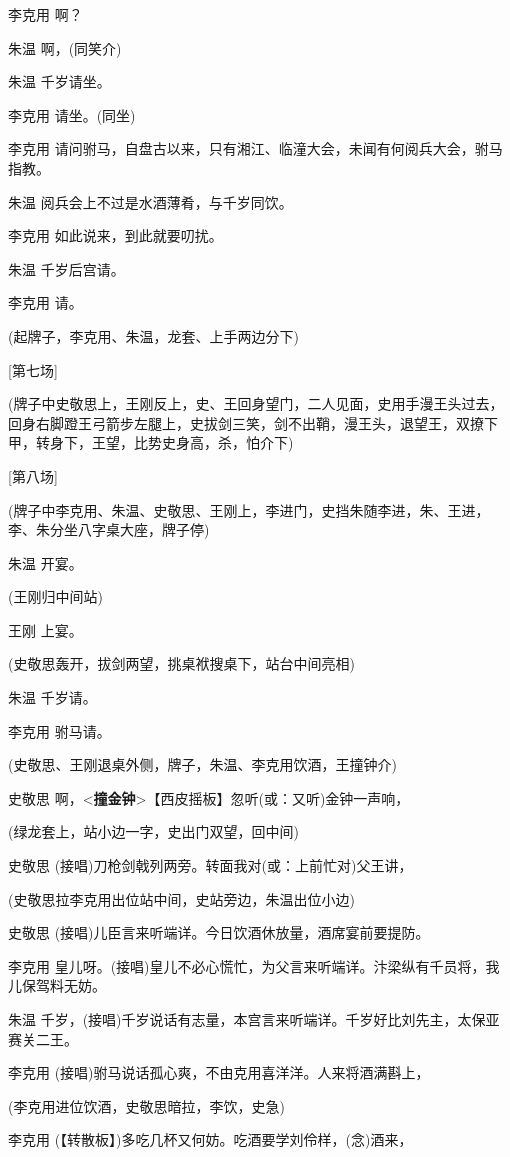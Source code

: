 李克用 啊？

朱温 啊，(同笑介)

朱温 千岁请坐。

李克用 请坐。(同坐)

李克用
请问驸马，自盘古以来，只有湘江、临潼大会，未闻有何阅兵大会，驸马指教。

朱温 阅兵会上不过是水酒薄肴，与千岁同饮。

李克用 如此说来，到此就要叨扰。

朱温 千岁后宫请。

李克用 请。

(起牌子，李克用、朱温，龙套、上手两边分下)

{[}第七场{]}

(牌子中史敬思上，王刚反上，史、王回身望门，二人见面，史用手漫王头过去，回身右脚蹬王弓箭步左腿上，史拔剑三笑，剑不出鞘，漫王头，退望王，双撩下甲，转身下，王望，比势史身高，杀，怕介下)

{[}第八场{]}

(牌子中李克用、朱温、史敬思、王刚上，李进门，史挡朱随李进，朱、王进，李、朱分坐八字桌大座，牌子停)

朱温 开宴。

(王刚归中间站)

王刚 上宴。

(史敬思轰开，拔剑两望，挑桌袱搜桌下，站台中间亮相)

朱温 千岁请。

李克用 驸马请。

(史敬思、王刚退桌外侧，牌子，朱温、李克用饮酒，王撞钟介)

史敬思
啊，\textless{}\textbf{撞金钟}\textgreater{}【西皮摇板】忽听(或：又听)金钟一声响，

(绿龙套上，站小边一字，史出门双望，回中间)

史敬思 (接唱)刀枪剑戟列两旁。转面我对(或：上前忙对)父王讲，

(史敬思拉李克用出位站中间，史站旁边，朱温出位小边)

史敬思 (接唱)儿臣言来听端详。今日饮酒休放量，酒席宴前要提防。

李克用
皇儿呀。(接唱)皇儿不必心慌忙，为父言来听端详。汴梁纵有千员将，我儿保驾料无妨。

朱温
千岁，(接唱)千岁说话有志量，本宫言来听端详。千岁好比刘先主，太保亚赛关二王。

李克用 (接唱)驸马说话孤心爽，不由克用喜洋洋。人来将酒满斟上，

(李克用进位饮酒，史敬思暗拉，李饮，史急)

李克用 (【转散板】)多吃几杯又何妨。吃酒要学刘伶样，(念)酒来，

